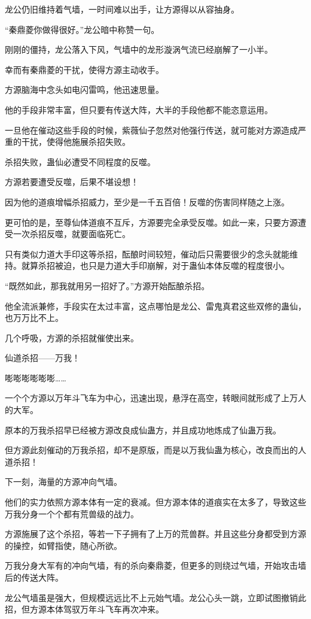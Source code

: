 \begin{this_body}
龙公仍旧维持着气墙，一时间难以出手，让方源得以从容抽身。

“秦鼎菱你做得很好。”龙公暗中称赞一句。

刚刚的僵持，龙公落入下风，气墙中的龙形漩涡气流已经崩解了一小半。

幸而有秦鼎菱的干扰，使得方源主动收手。

方源脑海中念头如电闪雷鸣，他迅速思量。

他的手段非常丰富，但只要有传送大阵，大半的手段他都不能恣意运用。

一旦他在催动这些手段的时候，紫薇仙子忽然对他强行传送，就可能对方源造成严重的干扰，使得他施展杀招失败。

杀招失败，蛊仙必遭受不同程度的反噬。

方源若要遭受反噬，后果不堪设想！

因为他的道痕增幅杀招威力，至少是一千五百倍！反噬的伤害同样随之上涨。

更可怕的是，至尊仙体道痕不互斥，方源要完全承受反噬。如此一来，只要方源遭受一次杀招反噬，就要面临死亡。

只有类似力道大手印这等杀招，酝酿时间较短，催动后只需要很少的念头就能维持。就算杀招被迫，也只是力道大手印崩解，对于蛊仙本体反噬的程度很小。

“既然如此，那我就用另一招好了。”方源开始酝酿杀招。

他全流派兼修，手段实在太过丰富，这点哪怕是龙公、雷鬼真君这些双修的蛊仙，也万万比不上。

几个呼吸，方源的杀招就催使出来。

仙道杀招——万我！

嘭嘭嘭嘭嘭嘭……

一个个方源以万年斗飞车为中心，迅速出现，悬浮在高空，转眼间就形成了上万人的大军。

原本的万我杀招早已经被方源改良成仙蛊方，并且成功地炼成了仙蛊万我。

但方源此刻催动的万我杀招，却不是原版，而是以万我仙蛊为核心，改良而出的人道杀招！

下一刻，海量的方源冲向气墙。

他们的实力依照方源本体有一定的衰减。但方源本体的道痕实在太多了，导致这些万我分身一个个都有荒兽级的战力。

方源施展了这个杀招，等若一下子拥有了上万的荒兽群。并且这些分身都受到方源的操控，如臂指使，随心所欲。

万我分身大军有的冲向气墙，有的杀向秦鼎菱，但更多的则绕过气墙，开始攻击墙后的传送大阵。

龙公气墙虽是强大，但规模远远比不上元始气墙。龙公心头一跳，立即试图撤销此招，但方源本体驾驭万年斗飞车再次冲来。


\end{this_body}
